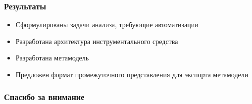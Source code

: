 \documentclass{beamer}
\begin{document}
\begin{frame}
\frametitle{Результаты}

\begin{itemize}
    \item Сформулированы задачи анализа, требующие автоматизации
    \item Разработана архитектура инструментального средства
    \item Разработана метамодель
    \item Предложен формат промежуточного представления для экспорта метамодели
\end{itemize}

\end{frame}
\begin{frame}
\frametitle{Спасибо за внимание}
\end{frame}
\end{document}
